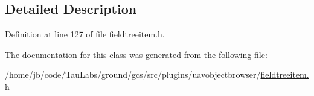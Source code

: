 \subsection{\-Detailed \-Description}


\-Definition at line 127 of file fieldtreeitem.\-h.



\-The documentation for this class was generated from the following file\-:\begin{DoxyCompactItemize}
\item 
/home/jb/code/\-Tau\-Labs/ground/gcs/src/plugins/uavobjectbrowser/\hyperlink{fieldtreeitem_8h}{fieldtreeitem.\-h}\end{DoxyCompactItemize}
